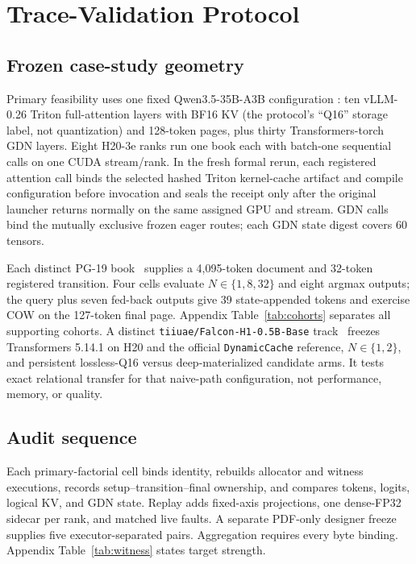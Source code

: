 \documentclass{article}
\begin{document}
\section{Trace-Validation Protocol}
\label{sec:protocol}

\subsection{Frozen case-study geometry}

Primary feasibility uses one fixed Qwen3.5-35B-A3B configuration
\citep{qwen2026qwen35,qwen2026qwen35modelcard}: ten vLLM-0.26 Triton
full-attention layers with BF16 KV (the protocol's ``Q16'' storage label, not
quantization) and 128-token pages, plus thirty
Transformers-torch GDN layers.  Eight H20-3e ranks run one book each with
batch-one sequential calls on one CUDA stream/rank.  In the fresh formal rerun,
each registered attention call binds the selected hashed Triton kernel-cache
artifact and compile configuration before invocation and seals the receipt only
after the original launcher returns normally on the same assigned GPU and
stream.  GDN calls bind the mutually exclusive frozen eager
routes; each GDN state digest covers 60 tensors.

Each distinct PG-19 book~\citep{rae2020compressive} supplies a 4,095-token
document and 32-token registered transition.  Four cells evaluate
$N\in\{1,8,32\}$ and eight argmax outputs; the query plus seven fed-back outputs
give 39 state-appended tokens and exercise COW on the 127-token final page.
Appendix Table~\ref{tab:cohorts} separates all supporting cohorts.  A distinct
\texttt{tiiuae/Falcon-H1-0.5B-Base} track~\citep{zuo2025falconh1} freezes
Transformers 5.14.1 on H20 and the official
\texttt{DynamicCache} reference, $N\in\{1,2\}$, and persistent lossless-Q16
versus deep-materialized candidate arms.  It tests exact relational transfer
for that naive-path configuration, not performance, memory, or quality.

\subsection{Audit sequence}

Each primary-factorial cell binds identity, rebuilds allocator and witness
executions, records setup--transition--final ownership, and compares tokens,
logits, logical KV, and GDN state.  Replay adds fixed-axis projections, one
dense-FP32 sidecar per rank, and matched live faults.  A separate PDF-only
designer freeze supplies five executor-separated pairs.  Aggregation requires
every byte binding.  Appendix Table~\ref{tab:witness} states target strength.
\end{document}
